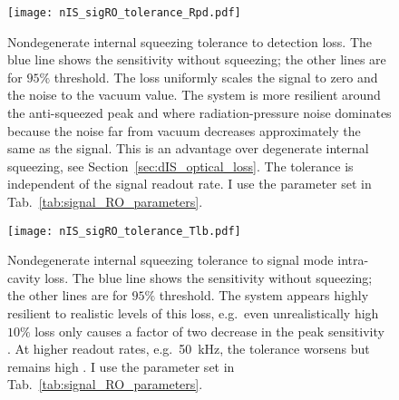 \begin{figure}
    \centering
    \texttt{[image: nIS\_sigRO\_tolerance\_Rpd.pdf]}
    \caption{ Nondegenerate internal squeezing tolerance to detection loss. The blue line shows the sensitivity without squeezing; the other lines are for $95\%$ threshold. The loss uniformly scales the signal to zero and the noise to the vacuum value. The system is more resilient around the anti-squeezed peak and where radiation-pressure noise dominates because the noise far from vacuum decreases approximately the same as the signal. This is an advantage over degenerate internal squeezing, see Section~\ref{sec:dIS_optical_loss}. The tolerance is independent of the signal readout rate. I use the parameter set in Tab.~\ref{tab:signal_RO_parameters}.}
    \label{fig:nIS_sigRO_tolerance_Rpd}
\end{figure}
\begin{figure}
    \centering
    \texttt{[image: nIS\_sigRO\_tolerance\_Tlb.pdf]}
    \caption{ Nondegenerate internal squeezing tolerance to signal mode intra-cavity loss. The blue line shows the sensitivity without squeezing; the other lines are for $95\%$ threshold.
    The system appears highly resilient to realistic levels of this loss, e.g.\ even unrealistically high $10\%$ loss only causes a factor of two decrease in the peak sensitivity . At higher readout rates, e.g.\ 50~kHz, the tolerance worsens but remains high . I use the parameter set in Tab.~\ref{tab:signal_RO_parameters}.
    }
    \label{fig:nIS_sigRO_tolerance_Tlb}
\end{figure}
